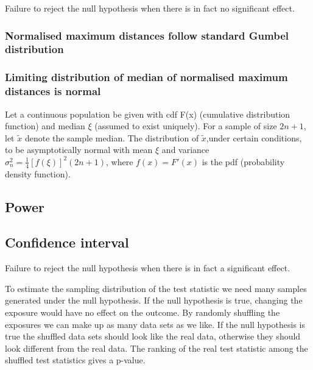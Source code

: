 \documentclass[
]{article}
\begin{document}
Failure to reject the null hypothesis when there is in fact no significant effect.

\hypertarget{normalised-maximum-distances-follow-standard-gumbel-distribution}{%
\subsubsection{Normalised maximum distances follow standard Gumbel distribution}\label{normalised-maximum-distances-follow-standard-gumbel-distribution}}

\hypertarget{limiting-distribution-of-median-of-normalised-maximum-distances-is-normal}{%
\subsubsection{Limiting distribution of median of normalised maximum distances is normal}\label{limiting-distribution-of-median-of-normalised-maximum-distances-is-normal}}

Let a continuous population be given with cdf F(x) (cumulative distribution function) and median \(\xi\) (assumed to exist uniquely). For a sample of size \(2n + 1\), let \(\tilde{x}\) denote the sample median. The distribution of \(\tilde{x}\),under certain conditions, to be asymptotically normal with mean \(\xi\) and variance \(\sigma_n^2 = \frac{1}{4} [f(\xi)]^2(2n + 1)\), where \(f(x) = F'(x)\) is the pdf (probability density function).

\hypertarget{power}{%
\subsection{Power}\label{power}}

\hypertarget{confidence-interval}{%
\subsection{Confidence interval}\label{confidence-interval}}

Failure to reject the null hypothesis when there is in fact a significant effect.

To estimate the sampling distribution of the test statistic we need many samples generated under the null hypothesis. If the null hypothesis is true, changing the exposure would have no effect on the outcome. By randomly shuffling the exposures we can make up as many data sets as we like. If the null hypothesis is true the shuffled data sets should look like the real data, otherwise they should look different from the
real data. The ranking of the real test statistic among the shuffled test statistics gives a p-value.
\end{document}
